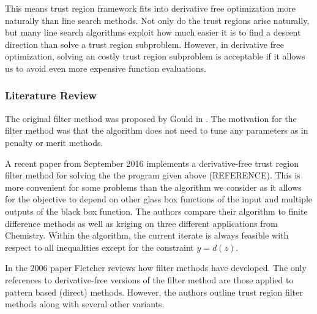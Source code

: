 \documentclass{article}
\begin{document}
This means trust region framework fits into derivative free optimization more naturally than line search methods.
Not only do the trust regions arise naturally, but many line search algorithms exploit how much easier it is to find a descent direction than solve a trust region subproblem.
However, in derivative free optimization, solving an costly trust region subproblem is acceptable if it allows us to avoid even more expensive function evaluations.





\subsubsection{Literature Review}

The original filter method was proposed by Gould in \cite{DUMMY:original_filter}. The motivation for the filter method was that the algorithm does not need to tune any parameters as in penalty or merit methods.

A recent paper from September 2016 \cite{DUMMY:Biegler} implements a derivative-free trust region filter method for solving the the program given above (REFERENCE).
This is more convenient for some problems than the algorithm we consider as it allows for the objective to depend on other glass box functions of the input and multiple outputs of the black box function.
The authors compare their algorithm to finite difference methods as well as kriging on three different applications from Chemistry. Within the algorithm, the current iterate is always feasible with respect to all inequalities except for the constraint $y=d(z)$.


In the 2006 paper \cite{DUMMY:Fletcher} Fletcher reviews how filter methods have developed.
The only references to derivative-free versions of the filter method are those applied to pattern based (direct) methods.
However, the authors outline trust region filter methods along with several other variants.
\end{document}
